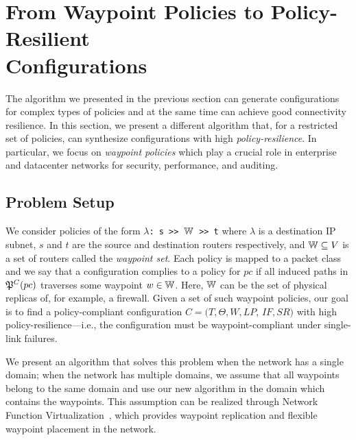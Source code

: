 \section{From Waypoint Policies to Policy-Resilient \\ Configurations}
\label{sec:waypointres}


The algorithm we presented in the previous section can generate configurations
for complex types of policies and at the same time can achieve good
connectivity resilience.
In this section, we present a different algorithm that, for a restricted set of policies,
can synthesize configurations with high \emph{policy-resilience}.
In particular, we focus on \emph{waypoint policies}
which play a crucial role in enterprise and
datacenter networks for security, performance,  
and auditing.

\subsection{Problem Setup}

We consider policies of the form 
\texttt{$\lambda$: s >> $\mathbb{W}$ >> t}
where $\lambda$ is a destination IP subnet,  
$s$ and $t$ are the source and destination routers respectively, 
and $\mathbb{W} \subseteq V$ is a set of routers called the \emph{waypoint set}. 
Each policy is mapped to a packet class and
we say that a configuration complies to a policy for $pc$ if 
all induced paths in $\mathfrak{P}^C(pc)$ 
traverses some waypoint $w \in \mathbb{W}$.
Here, $\mathbb{W}$
can be the set of physical replicas of,  for example, a firewall.
Given a set of such waypoint policies, our goal is to
find a policy-compliant configuration 
$C=(T,\Theta,W,LP$, $IF,SR)$ 
with high policy-resilience---i.e., the configuration
must be waypoint-compliant under single-link failures. 

We present an algorithm
that solves this problem when the network 
has a single domain;
when the network has multiple domains, 
we assume that all waypoints
belong to the same domain and
use our new algorithm in the domain 
which contains the waypoints.  
This assumption can be realized
through Network Function Virtualization~\cite{opennf, netbricks},
which provides waypoint replication and 
 flexible waypoint placement in the network.



%

